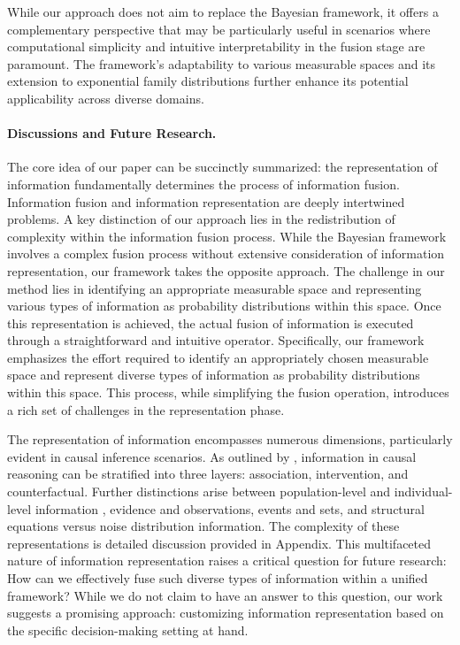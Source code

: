 \documentclass[letterpaper]{article} %
\theoremstyle{definition}
\theoremstyle{remark}
\begin{document}
While our approach does not aim to replace the Bayesian framework, it offers a complementary perspective that may be particularly useful in scenarios where computational simplicity and intuitive interpretability in the fusion stage are paramount. The framework's adaptability to various measurable spaces and its extension to exponential family distributions further enhance its potential applicability across diverse domains.



\paragraph{Discussions and Future Research.} 
The core idea of our paper can be succinctly summarized: the representation of information fundamentally determines the process of information fusion. Information fusion and information representation are deeply intertwined problems. A key distinction of our approach lies in the redistribution of complexity within the information fusion process. While the Bayesian framework involves a complex fusion process without extensive consideration of information representation, our framework takes the opposite approach. The challenge in our method lies in identifying an appropriate measurable space and representing various types of information as probability distributions within this space. Once this representation is achieved, the actual fusion of information is executed through a straightforward and intuitive operator. Specifically, our framework emphasizes the effort required to identify an appropriately chosen measurable space and represent diverse types of information as probability distributions within this space. This process, while simplifying the fusion operation, introduces a rich set of challenges in the representation phase.

The representation of information encompasses numerous dimensions, particularly evident in causal inference scenarios. As outlined by \citet{Pearl2019}, information in causal reasoning can be stratified into three layers: association, intervention, and counterfactual. Further distinctions arise between population-level and individual-level information \citet{gong2024distribution}, evidence and observations, events and sets, and structural equations versus noise distribution information. The complexity of these representations is  detailed discussion provided in Appendix. This multifaceted nature of information representation raises a critical question for future research: How can we effectively fuse such diverse types of information within a unified framework? While we do not claim to have an answer to this question, our work suggests a promising approach: customizing information representation based on the specific decision-making setting at hand.
\end{document}
